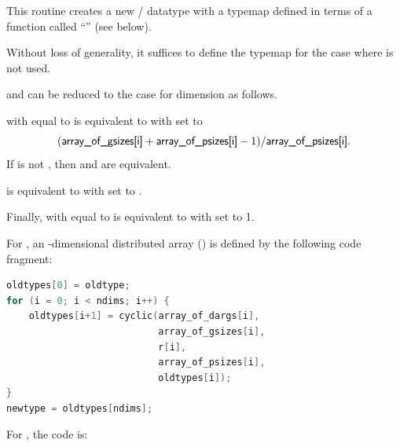 This routine creates a new \MPI/ datatype with a typemap defined in
terms of a function called ``'' (see below).

Without loss of generality, it suffices to define the typemap
for the  case where
 is not used.

 and 
can be reduced to the  case
for dimension
as follows.

 with
 equal to 
is equivalent to
with  set to
\[
(\mpiarg{array\_of\_gsizes[i]} + \mpiarg{array\_of\_psizes[i]} - 1)
        / \mpiarg{array\_of\_psizes[i]}.
\]
If  is not ,
then  and 
are equivalent.

 is equivalent to
with  set to .

Finally,
 with
 equal to 
is equivalent to
 with
 set to 1.

For ,
an -dimensional distributed array ()
is defined by the following code fragment:

\begin{lstlisting}[language=C]
oldtypes[0] = oldtype;
for (i = 0; i < ndims; i++) {
    oldtypes[i+1] = cyclic(array_of_dargs[i],
                           array_of_gsizes[i],
                           r[i],
                           array_of_psizes[i],
                           oldtypes[i]);
}
newtype = oldtypes[ndims];
\end{lstlisting}

For , the code is:

